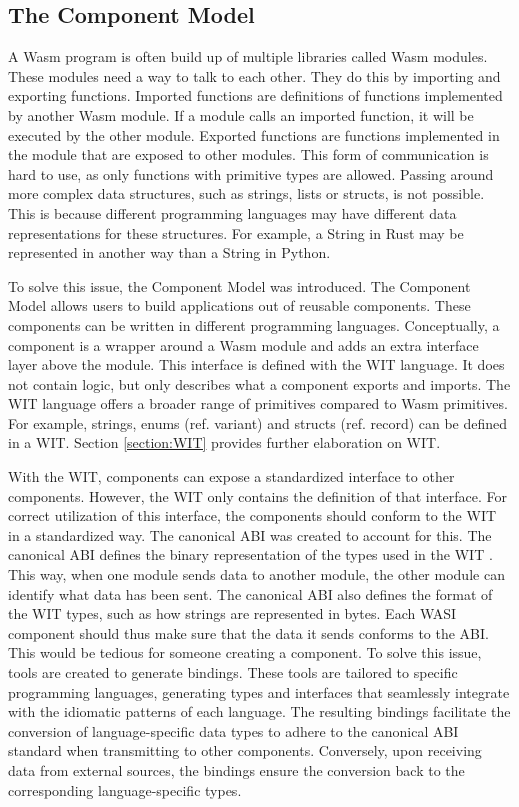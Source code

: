 \subsection{The Component Model}
\label{section:thecomponentmodel}

A \acrshort{Wasm} program is often build up of multiple libraries called Wasm modules. These modules need a way to talk to each other. They do this by importing and exporting functions. Imported functions are definitions of functions implemented by another Wasm module. If a module calls an imported function, it will be executed by the other module. Exported functions are functions implemented in the module that are exposed to other modules. 
This form of communication is hard to use, as only functions with primitive types are allowed. Passing around more complex data structures, such as strings, lists or structs, is not possible. This is because different programming languages may have different data representations for these structures. For example, a String in Rust may be represented in another way than a String in Python.

To solve this issue, the Component Model was introduced. The Component Model allows users to build applications out of reusable components. These components can be written in different programming languages. Conceptually, a component is a wrapper around a \acrshort{Wasm} module and adds an extra interface layer above the module. This interface is defined with the \acrshort{WIT} language. It does not contain logic, but only describes what a component exports and imports. The \acrshort{WIT} language offers a broader range of primitives compared to \acrshort{Wasm} primitives. For example, strings, enums (ref. variant) and structs (ref. record) can be defined in a \acrshort{WIT}. Section \ref{section:WIT} provides further elaboration on WIT.

With the \acrshort{WIT}, components can expose a standardized interface to other components. However, the \acrshort{WIT} only contains the definition of that interface. For correct utilization of this interface, the components should conform to the \acrshort{WIT} in a standardized way. The canonical \acrshort{ABI} was created to account for this. The canonical \acrshort{ABI} defines the binary representation of the types used in the \acrshort{WIT} \cite{canonical_abi}. This way, when one module sends data to another module, the other module can identify what data has been sent. The canonical \acrshort{ABI} also defines the format of the \acrshort{WIT} types, such as how strings are represented in bytes. Each \acrshort{WASI} component should thus make sure that the data it sends conforms to the ABI. This would be tedious for someone creating a component. To solve this issue, tools are created to generate bindings. These tools are tailored to specific programming languages, generating types and interfaces that seamlessly integrate with the idiomatic patterns of each language. The resulting bindings facilitate the conversion of language-specific data types to adhere to the canonical ABI standard when transmitting to other components. Conversely, upon receiving data from external sources, the bindings ensure the conversion back to the corresponding language-specific types.

